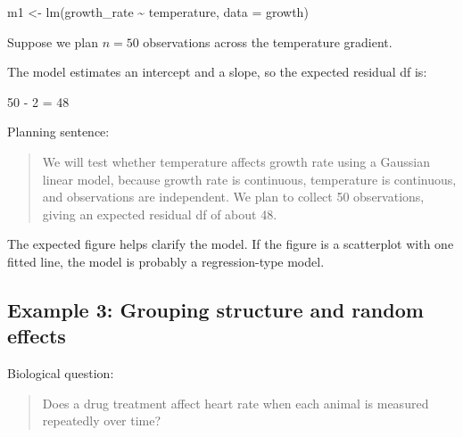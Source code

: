 \documentclass[
  letterpaper,
  8pt,
  a4paper]{book}
\newenvironment{Shaded}{\begin{snugshade}}{\end{snugshade}}
\newcommand{\AttributeTok}[1]{\textcolor[rgb]{0.40,0.45,0.13}{#1}}
\newcommand{\FunctionTok}[1]{\textcolor[rgb]{0.28,0.35,0.67}{#1}}
\newcommand{\NormalTok}[1]{\textcolor[rgb]{0.00,0.23,0.31}{#1}}
\newcommand{\OtherTok}[1]{\textcolor[rgb]{0.00,0.23,0.31}{#1}}
\newcommand{\SpecialCharTok}[1]{\textcolor[rgb]{0.37,0.37,0.37}{#1}}
\begin{document}
\begin{Shaded}
\begin{Highlighting}[]
\NormalTok{m1 }\OtherTok{\textless{}{-}} \FunctionTok{lm}\NormalTok{(growth\_rate }\SpecialCharTok{\textasciitilde{}}\NormalTok{ temperature, }\AttributeTok{data =}\NormalTok{ growth)}
\end{Highlighting}
\end{Shaded}

Suppose we plan \(n = 50\) observations across the temperature gradient.

The model estimates an intercept and a slope, so the expected residual
df is:

\begin{Shaded}
\begin{Highlighting}[]
\NormalTok{50 {-} 2 = 48}
\end{Highlighting}
\end{Shaded}

Planning sentence:

\begin{quote}
We will test whether temperature affects growth rate using a Gaussian
linear model, because growth rate is continuous, temperature is
continuous, and observations are independent. We plan to collect 50
observations, giving an expected residual df of about 48.
\end{quote}

The expected figure helps clarify the model. If the figure is a
scatterplot with one fitted line, the model is probably a
regression-type model.

\subsection*{Example 3: Grouping structure and random
effects}\label{example-3-grouping-structure-and-random-effects}

Biological question:

\begin{quote}
Does a drug treatment affect heart rate when each animal is measured
repeatedly over time?
\end{quote}
\end{document}
